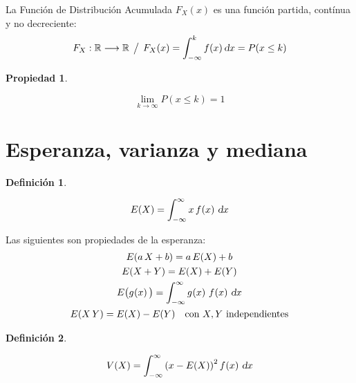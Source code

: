 \documentclass[a5paper,12pt,twoside]{book}
\newtheorem{defn}{{Definición}}[chapter]
\newtheorem{prop}{{Propiedad}}[chapter]
\begin{document}
La Función de Distribución Acumulada $F_X(x)$ es una función partida, contínua y no decreciente:
\begin{equation*}
    F_X: \setR \longrightarrow \setR \tq F_X(x) = \int_{-\infty}^k f(x) \, \dif x = P(x \leq k)
\end{equation*}

\begin{mdframed}[style=PropertyFrame]
    \begin{prop}
    \end{prop}
    \begin{equation*}
        \lim_{k \to \infty} P(x \leq k)=1
    \end{equation*}
\end{mdframed}


\section{Esperanza, varianza y mediana}

\begin{mdframed}[style=DefinitionFrame]
    \begin{defn}
    \end{defn}
    \begin{equation*}
        E(X) = \int_{-\infty}^{\infty} x \, \fx{x} \, \dif x
    \end{equation*}
\end{mdframed}

Las siguientes son propiedades de la esperanza:
\begin{gather*}
    E(a \, X + b) = a \, E(X) + b
    \\
    E(X+Y) = E(X) + E(Y)
    \\
    E \big( \fx[g]{x} \big) = \int_{-\infty}^{\infty} \fx[g]{x} \, \fx{x} \, \dif x
    \\
    E(X \, Y) = E(X) - E(Y) \quad \text{con $X,Y$ independientes}
\end{gather*}

\begin{mdframed}[style=DefinitionFrame]
    \begin{defn}
    \end{defn}
    \begin{equation*}
        V(X) = \int_{-\infty}^{\infty} \inParentheses{x - E(X)}^2 \fx{x} \, \dif x
    \end{equation*}
\end{mdframed}
\end{document}
